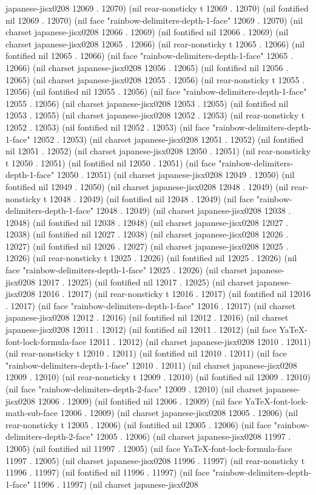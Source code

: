 japanese-jisx0208 12069 . 12070) (nil rear-nonsticky t 12069 . 12070) (nil fontified nil 12069 . 12070) (nil face "rainbow-delimiters-depth-1-face" 12069 . 12070) (nil charset japanese-jisx0208 12066 . 12069) (nil fontified nil 12066 . 12069) (nil charset japanese-jisx0208 12065 . 12066) (nil rear-nonsticky t 12065 . 12066) (nil fontified nil 12065 . 12066) (nil face "rainbow-delimiters-depth-1-face" 12065 . 12066) (nil charset japanese-jisx0208 12056 . 12065) (nil fontified nil 12056 . 12065) (nil charset japanese-jisx0208 12055 . 12056) (nil rear-nonsticky t 12055 . 12056) (nil fontified nil 12055 . 12056) (nil face "rainbow-delimiters-depth-1-face" 12055 . 12056) (nil charset japanese-jisx0208 12053 . 12055) (nil fontified nil 12053 . 12055) (nil charset japanese-jisx0208 12052 . 12053) (nil rear-nonsticky t 12052 . 12053) (nil fontified nil 12052 . 12053) (nil face "rainbow-delimiters-depth-1-face" 12052 . 12053) (nil charset japanese-jisx0208 12051 . 12052) (nil fontified nil 12051 . 12052) (nil charset japanese-jisx0208 12050 . 12051) (nil rear-nonsticky t 12050 . 12051) (nil fontified nil 12050 . 12051) (nil face "rainbow-delimiters-depth-1-face" 12050 . 12051) (nil charset japanese-jisx0208 12049 . 12050) (nil fontified nil 12049 . 12050) (nil charset japanese-jisx0208 12048 . 12049) (nil rear-nonsticky t 12048 . 12049) (nil fontified nil 12048 . 12049) (nil face "rainbow-delimiters-depth-1-face" 12048 . 12049) (nil charset japanese-jisx0208 12038 . 12048) (nil fontified nil 12038 . 12048) (nil charset japanese-jisx0208 12027 . 12038) (nil fontified nil 12027 . 12038) (nil charset japanese-jisx0208 12026 . 12027) (nil fontified nil 12026 . 12027) (nil charset japanese-jisx0208 12025 . 12026) (nil rear-nonsticky t 12025 . 12026) (nil fontified nil 12025 . 12026) (nil face "rainbow-delimiters-depth-1-face" 12025 . 12026) (nil charset japanese-jisx0208 12017 . 12025) (nil fontified nil 12017 . 12025) (nil charset japanese-jisx0208 12016 . 12017) (nil rear-nonsticky t 12016 . 12017) (nil fontified nil 12016 . 12017) (nil face "rainbow-delimiters-depth-1-face" 12016 . 12017) (nil charset japanese-jisx0208 12012 . 12016) (nil fontified nil 12012 . 12016) (nil charset japanese-jisx0208 12011 . 12012) (nil fontified nil 12011 . 12012) (nil face YaTeX-font-lock-formula-face 12011 . 12012) (nil charset japanese-jisx0208 12010 . 12011) (nil rear-nonsticky t 12010 . 12011) (nil fontified nil 12010 . 12011) (nil face "rainbow-delimiters-depth-1-face" 12010 . 12011) (nil charset japanese-jisx0208 12009 . 12010) (nil rear-nonsticky t 12009 . 12010) (nil fontified nil 12009 . 12010) (nil face "rainbow-delimiters-depth-2-face" 12009 . 12010) (nil charset japanese-jisx0208 12006 . 12009) (nil fontified nil 12006 . 12009) (nil face YaTeX-font-lock-math-sub-face 12006 . 12009) (nil charset japanese-jisx0208 12005 . 12006) (nil rear-nonsticky t 12005 . 12006) (nil fontified nil 12005 . 12006) (nil face "rainbow-delimiters-depth-2-face" 12005 . 12006) (nil charset japanese-jisx0208 11997 . 12005) (nil fontified nil 11997 . 12005) (nil face YaTeX-font-lock-formula-face 11997 . 12005) (nil charset japanese-jisx0208 11996 . 11997) (nil rear-nonsticky t 11996 . 11997) (nil fontified nil 11996 . 11997) (nil face "rainbow-delimiters-depth-1-face" 11996 . 11997) (nil charset japanese-jisx0208 